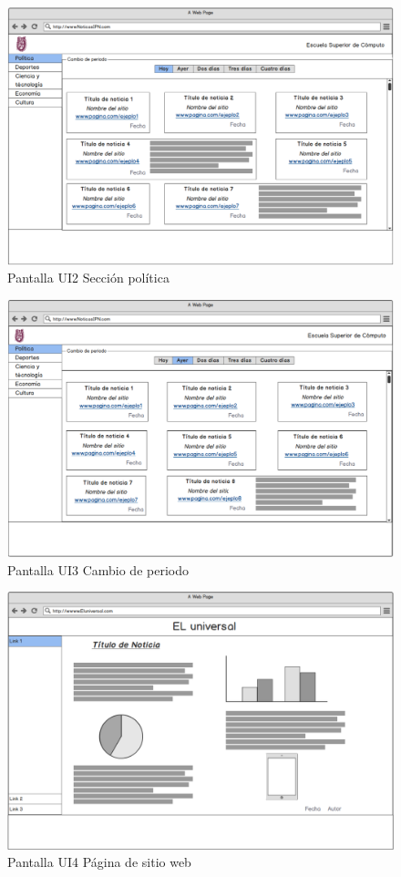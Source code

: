 \begin{figure}[h]
  \centering 
	\includegraphics[scale=.35]{imagenes/Pantallas/UI2}
  \caption{Pantalla UI2 Sección política}
  \label{fig:UI2}
\end{figure}



\begin{figure}[h]
  \centering
	\includegraphics[scale=.35]{imagenes/Pantallas/UI3}
  \caption{Pantalla UI3 Cambio de periodo}
  \label{fig:UI3}
\end{figure}


\begin{figure}[h]
  \centering
	\includegraphics[scale=.35]{imagenes/Pantallas/UI4}
  \caption{Pantalla UI4 Página de sitio web}
  \label{fig:UI4}
\end{figure}